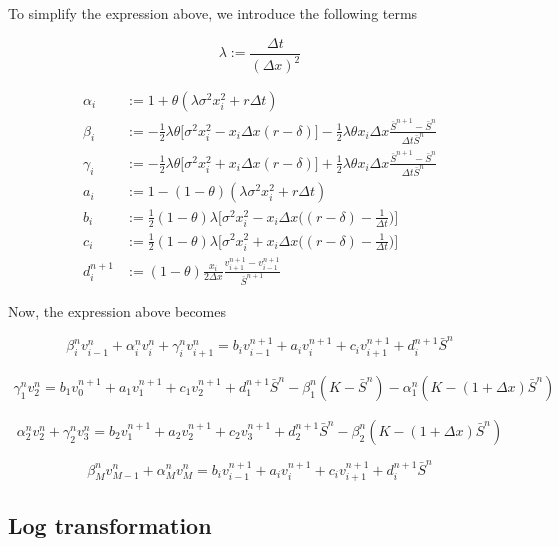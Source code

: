 To simplify the expression above, we introduce the following terms

\begin{equation}
    \lambda := \frac{\Delta t}{(\Delta x)^2}
\end{equation}

\begin{align}
    \alpha_i &:= 1 + \theta (\lambda \sigma^2 x_{i}^{2} + r{\Delta t}) \\
    \beta_i &:= - \frac{1}{2} \lambda \theta \bigg[ \sigma^{2} x_{i}^{2} - x_i \Delta x (r - \delta) \bigg]  - \frac{1}{2} \lambda \theta   x_i \Delta x \frac{\bar{S}^{n+1} - \bar{S}^{n}}{\Delta t \bar{S}^n}  \\
    \gamma_i &:= -\frac{1}{2} \lambda \theta \bigg[ \sigma^{2} x_{i}^{2} + x_i \Delta x (r - \delta) \bigg]  + \frac{1}{2} \lambda \theta  x_i \Delta x  \frac{\bar{S}^{n+1} - \bar{S}^{n}}{\Delta t \bar{S}^n}\\
    a_i &:= 1 - (1-\theta) (\lambda \sigma^2 x_{i}^{2} +  r{\Delta t}) \\
    b_i &:= \frac{1}{2} (1-\theta) \lambda \bigg[\sigma^{2} x_{i}^{2} - x_i \Delta x \bigg( (r - \delta) - \frac{1}{\Delta t} \bigg) \bigg] \\
    c_i &:= \frac{1}{2} (1-\theta) \lambda \bigg[ \sigma^{2} x_{i}^{2} +  x_i \Delta x \bigg( (r - \delta) - \frac{1}{\Delta t} \bigg) \bigg] \\
    d^{n+1}_i &:= (1-\theta) \frac{x_i}{2 \Delta x}  \frac{v^{n+1}_{i+1} - v^{n+1}_{i-1}}{\bar{S}^{n+1}}
\end{align}

Now, the expression above becomes

\begin{equation}
    \beta^{n}_{i} v^{n}_{i-1} + \alpha^{n}_{i} v^{n}_{i} + \gamma^{n}_{i} v^{n}_{i+1} = b_i v^{n+1}_{i-1} + a_i v^{n+1}_{i} + c_i v^{n+1}_{i+1} + d^{n+1}_{i}\bar{S}^{n}
\end{equation}

\begin{align}
    \gamma^{n}_{1} v^{n}_{2} = b_1 v^{n+1}_{0} + a_1 v^{n+1}_{1} + c_1 v^{n+1}_{2} + d^{n+1}_{1}\bar{S}^{n} - \beta^{n}_{1} (K - \bar{S}^n) - \alpha^{n}_{1} (K - (1+\Delta x)\bar{S}^n) 
\end{align}

\begin{equation}
    \alpha^{n}_{2} v^{n}_{2} + \gamma^{n}_{2} v^{n}_{3} = b_2 v^{n+1}_{1} + a_2 v^{n+1}_{2} + c_2 v^{n+1}_{3} + d^{n+1}_{2}\bar{S}^{n} - \beta^{n}_{2} (K - (1+\Delta x)\bar{S}^n) 
\end{equation}

\begin{equation}
    \beta^{n}_{M} v^{n}_{M-1} + \alpha^{n}_{M} v^{n}_{M} = b_i v^{n+1}_{i-1} + a_i v^{n+1}_{i} + c_i v^{n+1}_{i+1} + d^{n+1}_{i}\bar{S}^{n}
\end{equation}

\subsection{Log transformation}